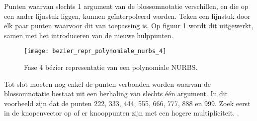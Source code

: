 \begin{itemize}
{\begin{itemize}
			Punten waarvan slechts 1 argument van de blossomnotatie verschillen, en die op een ander lijnstuk liggen, kunnen geïnterpoleerd worden. Teken een lijnstuk door elk paar punten waarvoor dit van toepassing is. Op figuur \ref{fig:bezier_repr_polynomiale_nurbs_4} wordt dit uitgewerkt, samen met het introduceren van de nieuwe hulppunten.
			\begin{figure}[ht]
				\centering
				\texttt{[image: bezier\_repr\_polynomiale\_nurbs\_4]}	
				\caption{Fase 4 bézier representatie van een polynomiale NURBS.}
				\label{fig:bezier_repr_polynomiale_nurbs_4}
			\end{figure}

			Tot slot moeten nog enkel de punten verbonden worden waarvan de blossomnotatie bestaat uit een herhaling van slechts één argument. In dit voorbeeld zijn dat de punten 222, 333, 444, 555, 666, 777, 888 en 999. Zoek eerst in de knopenvector op of er knooppunten zijn met een hogere multipliciteit. .
			

\end{itemize}}
\end{itemize}
